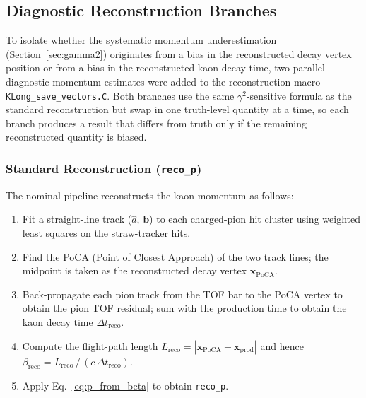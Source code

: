 %
%

\subsection{Diagnostic Reconstruction Branches}
\label{sec:diagnostic_branches}

To isolate whether the systematic momentum underestimation (Section~\ref{sec:gamma2})
originates from a bias in the reconstructed decay vertex position or from a bias in the
reconstructed kaon decay time, two parallel diagnostic momentum estimates were added to
the reconstruction macro \texttt{KLong\_save\_vectors.C}.  Both branches use the same
$\gamma^2$-sensitive formula as the standard reconstruction but swap in one truth-level
quantity at a time, so each branch produces a result that differs from truth only if the
remaining reconstructed quantity is biased.

\subsubsection{Standard Reconstruction (\texttt{reco\_p})}

The nominal pipeline reconstructs the kaon momentum as follows:
\begin{enumerate}
  \item Fit a straight-line track ($\hat{a}$, $\bm{b}$) to each charged-pion hit cluster
        using weighted least squares on the straw-tracker hits.
  \item Find the PoCA (Point of Closest Approach) of the two track lines; the midpoint is
        taken as the reconstructed decay vertex $\bm{x}_{\text{PoCA}}$.
  \item Back-propagate each pion track from the TOF bar to the PoCA vertex to obtain the
        pion TOF residual; sum with the production time to obtain the kaon decay time
        $\Delta t_{\text{reco}}$.
  \item Compute the flight-path length
        $L_{\text{reco}} = |\bm{x}_{\text{PoCA}} - \bm{x}_{\text{prod}}|$
        and hence $\beta_{\text{reco}} = L_{\text{reco}}\,/\,(c\,\Delta t_{\text{reco}})$.
  \item Apply Eq.~\eqref{eq:p_from_beta} to obtain \texttt{reco\_p}.
\end{enumerate}

